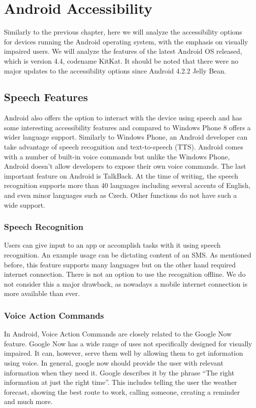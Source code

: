 \chapter{Android Accessibility}
Similarly to the previous chapter, here we will analyze the accessibility options for devices running the Android operating system, with the emphasis on visually impaired users. We will analyze the features of the latest Android OS released, which is version 4.4, codename KitKat. It should be noted that there were no major updates to the accessibility options since Android 4.2.2 Jelly Bean.
\section{Speech Features}
Android also offers the option to interact with the device using speech and has some interesting accessibility features and compared to Windows Phone 8 offers a wider language support. Similarly to Windows Phone, an Android developer can take advantage of speech recognition and text-to-speech (TTS). Android comes with a number of built-in voice commands but unlike the Windows Phone, Android doesn’t allow developers to expose their own voice commands. The last important feature on Android is TalkBack.
At the time of writing, the speech recognition supports more than 40 languages including several accents of English, and even minor languages such as Czech. Other functions do not have such a wide support. 
\subsection{Speech Recognition}
Users can give input to an app or accomplish tasks with it using speech recognition. An example usage can be dictating content of an SMS. As mentioned before, this feature supports many languages but on the other hand required internet connection. There is not an option to use the recognition offline. We do not consider this a major drawback, as nowadays a mobile internet connection is more available than ever.
\subsection{Voice Action Commands}
In Android, Voice Action Commands are closely related to the Google Now feature. Google Now has a wide range of uses not specifically designed for visually impaired. It can, however, serve them well by allowing them to get information using voice.
In general, google now should provide the user with relevant information when they need it. Google describes it by the phrase “The right information at just the right time”. This includes telling the user the weather forecast, showing the best route to work, calling someone, creating a reminder and much more.

